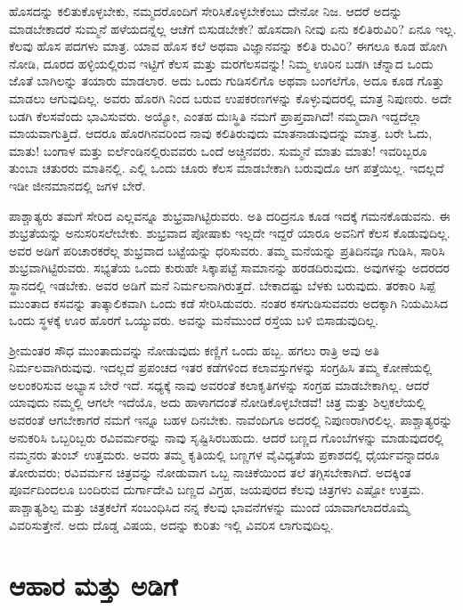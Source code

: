 ಹೊಸದನ್ನು ಕಲಿತುಕೊಳ್ಳಬೇಕು, ನಮ್ಮದರೊಂದಿಗೆ ಸೇರಿಸಿಕೊಳ್ಳಬೇಕೆಂಬು ದೇನೋ ನಿಜ. ಆದರೆ ಅದನ್ನು ಮಾಡಬೇಕಾದರೆ ಸುಮ್ಮನೆ ಹಳೆಯದನ್ನೆಲ್ಲ ಆಚೆಗೆ ಬಿಸುಡಬೇಕೇ? ಹೊಸದಾಗಿ ನೀವು ಏನು ಕಲಿತಿರುವಿರಿ? ಏನೂ ಇಲ್ಲ. ಕೆಲವು ಹೊಸ ಪದಗಳು ಮಾತ್ರ. ಯಾವ ಹೊಸ ಕಲೆ ಅಥವಾ ವಿಜ್ಞಾನವನ್ನು ಕಲಿತಿ ರುವಿರಿ? ಈಗಲೂ ಕೂಡ ಹೋಗಿ ನೋಡಿ, ದೂರದ ಹಳ್ಳಿಯಲ್ಲಿರುವ ಇಟ್ಟಿಗೆ ಕೆಲಸ ಮತ್ತು ಮರಗೆಲಸವನ್ನು! ನಿಮ್ಮ ಊರಿನ ಬಡಗಿ ಚೆನ್ನಾದ ಒಂದು ಜೊತೆ ಬಾಗಿಲನ್ನು ತಯಾರು ಮಾಡಲಾರ. ಅದು ಒಂದು ಗುಡಿಸಲಿಗೊ ಅಥವಾ ಬಂಗಲೆಗೊ, ಅದೂ ಕೂಡ ಗೊತ್ತು ಮಾಡಲು ಆಗುವುದಿಲ್ಲ. ಅವರು ಹೊರಗಿ ನಿಂದ ಬರುವ ಉಪಕರಣಗಳನ್ನು ಕೊಳ್ಳುವುದರಲ್ಲಿ ಮಾತ್ರ ನಿಪುಣರು. ಅದೇ ಬಡಗಿ ಕೆಲಸವೆಂದು ಭಾವಿಸುವರು. ಅಯ್ಯೋ, ಎಂತಹ ದುಃಸ್ಥಿತಿ ನಮಗೆ ಪ್ರಾಪ್ತವಾಗಿದೆ! ನಮ್ಮದಾಗಿ ಇದ್ದದೆಲ್ಲಾ ಮಾಯವಾಗುತ್ತಿದೆ. ಆದರೂ ಹೊರಗಿನವರಿಂದ ನಾವು ಕಲಿತಿರುವುದು ಮಾತನಾಡುವುದನ್ನು ಮಾತ್ರ. ಬರೇ ಓದು, ಮಾತು! ಬಂಗಾಳ ಮತ್ತು ಐರ್ಲೆಂಡಿನಲ್ಲಿರುವವರು ಒಂದೆ ಅಚ್ಚಿನವರು. ಸುಮ್ಮನೆ ಮಾತು ಮಾತು! ಇವರಿಬ್ಬರೂ ತುಂಬಾ ಚತುರರು ಮಾತಿನಲ್ಲಿ. ಎಲ್ಲಿ ಒಂದು ಚೂರು ಕೆಲಸ ಮಾಡಬೇಕಾಗಿ ಬರುವುದೊ ಆಗ ಪತ್ತೆಯಿಲ್ಲ. ಇದಲ್ಲದೆ ಇಡೀ ಜೀನಮಾನದಲ್ಲಿ ಜಗಳ ಬೇರೆ.

ಪಾಶ್ಚಾತ್ಯರು ತಮಗೆ ಸೇರಿದ ಎಲ್ಲವನ್ನೂ ಶುಭ್ರವಾಗಿಟ್ಟಿರುವರು. ಅತಿ ದರಿದ್ರನೂ ಕೂಡ ಇದಕ್ಕೆ ಗಮನಕೊಡುವನು. ಈ ಶುಭ್ರತೆಯನ್ನು ಅನುಸರಿಸಲೇಬೇಕು. ಶುಭ್ರವಾದ ಪೋಷಾಕು ಇಲ್ಲದೇ ಇದ್ದರೆ ಯಾರೂ ಅವನಿಗೆ ಕೆಲಸ ಕೊಡುವುದಿಲ್ಲ. ಅವರ ಅಡಿಗೆ ಪರಿಚಾರಕರೆಲ್ಲ ಶುಭ್ರವಾದ ಬಟ್ಟೆಯನ್ನು ಧರಿಸುವರು. ತಮ್ಮ ಮನೆಯನ್ನು ಪ್ರತಿದಿನವೂ ಗುಡಿಸಿ, ಸಾರಿಸಿ ಶುಭ್ರವಾಗಿಟ್ಟಿರುವರು. ಸಭ್ಯತೆಯ ಒಂದು ಕುರುಹೇ ಸಿಕ್ಕಾಪಟ್ಟೆ ಸಾಮಾನನ್ನು ಹರಡದಿರುವುದು. ಅವುಗಳನ್ನು ಅದರದರ ಸ್ಥಾನದಲ್ಲಿ ಇಡಬೇಕು. ಅವರ ಅಡಿಗೆ ಮನೆ ನಿರ್ಮಲನಾಗಿರುತ್ತದೆ. ಬೇಕಾದಷ್ಟು ಬೆಳಕು ಬರುವುದು. ತರಕಾರಿ ಸಿಪ್ಪೆ ಮುಂತಾದ ಕಸವನ್ನು ತಾತ್ಕಾಲಿಕವಾಗಿ ಒಂದು ಕಡೆ ಸೇರಿಸಿಡುವರು. ನಂತರ ಕಸಗುಡಿಸುವವರು ಅದಕ್ಕಾಗಿ ನಿಯಮಿಸಿದ ಒಂದು ಸ್ಥಳಕ್ಕೆ ಊರ ಹೊರಗೆ ಒಯ್ಯುವರು. ಅವನ್ನು ಮನೆಮುಂದೆ ರಸ್ತೆಯ ಬಳಿ ಬಿಸಾಡುವುದಿಲ್ಲ.

ಶ‍್ರೀಮಂತರ ಸೌಧ ಮುಂತಾದುವನ್ನು ನೋಡುವುದು ಕಣ್ಣಿಗೆ ಒಂದು ಹಬ್ಬ. ಹಗಲು ರಾತ್ರಿ ಅವು ಅತಿ ನಿರ್ಮಲವಾಗಿರುವುವು. ಇದಲ್ಲದೆ ಪ್ರಪಂಚದ ಇತರ ಕಡೆಗಳಿಂದ ಕಲಾವಸ್ತುಗಳನ್ನು ಸಂಗ್ರಹಿಸಿ ತಮ್ಮ ಕೋಣೆಯಲ್ಲಿ ಅಲಂಕರಿಸುವ ಅಭ್ಯಾಸ ಬೇರೆ ಇದೆ. ಸಧ್ಯಕ್ಕೆ ನಾವು ಅವರಂತೆ ಕಲಾಕೃತಿಗಳನ್ನು ಸಂಗ್ರಹ ಮಾಡಬೇಕಾಗಿಲ್ಲ. ಆದರೆ ಯಾವುದು ನಮ್ಮಲ್ಲಿ ಆಗಲೇ ಇದೆಯೊ, ಅದು ಹಾಳಾಗದಂತೆ ನೋಡಿಕೊಳ್ಳಬೇಡವೆ! ಚಿತ್ರ ಮತ್ತು ಶಿಲ್ಪಕಲೆಯಲ್ಲಿ ಅವರಂತೆ ಆಗಬೇಕಾಗರೆ ನಮಗೆ ಇನ್ನೂ ಬಹಳ ದಿನಬೇಕು. ನಾವೆಂದಿಗೂ ಅದರಲ್ಲಿ ನಿಪುಣರಾಗಿರಲಿಲ್ಲ. ಪಾಶ್ಚಾತ್ಯರನ್ನು ಅನುಕರಿಸಿ ಒಬ್ಬರಿಬ್ಬರು ರವಿವರ್ಮರನ್ನು ನಾವು ಸೃಷ್ಟಿಸಿರಬಹುದು. ಆದರೆ ಬಣ್ಣದ ಗೊಂಬೆಗಳನ್ನು ಮಾಡುವುದರಲ್ಲಿ ನಮ್ಮನರು ತುಂಬ್ ಉತ್ತಮರು. ಅವರು ತಮ್ಮ ಕೃತಿಯಲ್ಲಿ ಬಣ್ಣಗಳ ವೈವಿಧ್ಯತೆಯ ಪ್ರಕಾಶದಲ್ಲಿ ಧೈರ್ಯವನ್ನಾದರೂ ತೋರುವರು; ರವಿವರ್ಮನ ಚಿತ್ರವನ್ನು ನೋಡುವಾಗ ಒಬ್ಬ ನಾಚಿಕೆಯಿಂದ ತಲೆ ತಗ್ಗಿಸಬೇಕಾಗಿದೆ. ಅದಕ್ಕಿಂತ ಪೂರ್ವದಿಂದಲೂ ಬಂದಿರುವ ದುರ್ಗಾದೇವಿ ಬಣ್ಣದ ವಿಗ್ರಹ, ಜಯಪುರದ ಕೆಲವು ಚಿತ್ರಗಳು ಎಷ್ಟೋ ಉತ್ತಮ. ಪಾಶ್ಚಾತ್ಯಶಿಲ್ಪ ಮತ್ತು ಚಿತ್ರಕಲೆಗೆ ಸಂಬಂಧಿಸಿದ ನನ್ನ ಕೆಲವು ಭಾವನೆಗಳನ್ನು ಮುಂದೆ ಯಾವಾಗಲಾದರೊಮ್ಮೆ ವಿವರಿಸುತ್ತೇನೆ. ಅದು ದೊಡ್ಡ ವಿಷಯ, ಅದನ್ನು ಕುರಿತು ಇಲ್ಲಿ ವಿವರಿಸ ಲಾಗುವುದಿಲ್ಲ.


\section{ಆಹಾರ ಮತ್ತು ಅಡಿಗೆ}

